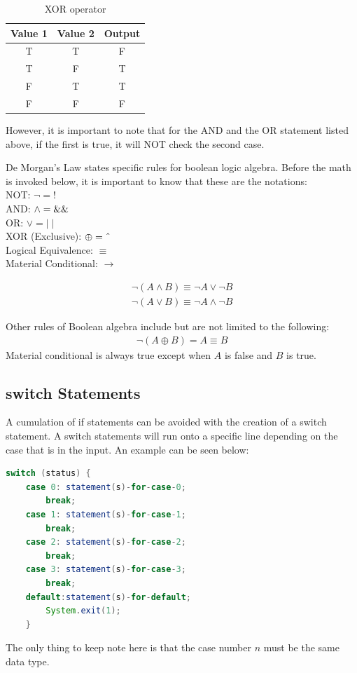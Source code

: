 \documentclass[11pt,a4 paper]{book}
\theoremstyle{plain}
\newtheorem{thm}{Theorem}[section]
\theoremstyle{definition}
\theoremstyle{remark}
\begin{document}
\begin{flushleft}
\begin{table}[H]
	\caption{XOR operator}
	\label{tab:XOR}
	\begin{tabular}{ccc}
		\hline
	Value 1 & Value 2 & Output \\
	\hline
	T & T & F \\
	T & F & T \\
	F & T & T \\
	F & F & F \\
	\hline
	\end{tabular}
\end{table}
However, it is important to note that for the AND and the OR statement listed above, if the first is true, it will NOT check the second case.
\begin{tcolorbox}[colback=black!3!white,colframe=black!60!white,title=\begin{thm}De Morgan's Law \label{De Morgan's Law}\end{thm}]
	De Morgan's Law states specific rules for boolean logic algebra. Before the math is invoked below, it is important to know that these are the notations: \\	
	NOT: $\neg = !$ \\
	AND: $\land = \string& \string& $ \\
	OR: $\lor =  \mid\mid $ \\
	XOR (Exclusive): $\oplus = \string^$ \\
	Logical Equivalence: $\equiv$ \\
	Material Conditional:  $\to $

		\begin{align}
			\neg\left( A \land B \right) \equiv \neg A \lor \neg B\\
			\neg\left( A \lor B \right) \equiv \neg A \land \neg B 
		\end{align}

\end{tcolorbox} 
Other rules of Boolean algebra include but are not limited to the following:
\begin{align*}
	\neg\left( A \oplus B\right) = A \equiv B
\end{align*}
Material conditional is always true except when $A$ is false and $B$ is true.

\subsection{switch Statements}
A cumulation of if statements can be avoided with the creation of a switch statement. A switch statements will run onto a specific line depending on the case that is in the input. An example can be seen below:
\begin{lstlisting}[language = Java]
switch (status) {
	case 0: statement(s)-for-case-0;
		break;
	case 1: statement(s)-for-case-1;
		break;
	case 2: statement(s)-for-case-2;
		break;
	case 3: statement(s)-for-case-3;
		break;
	default:statement(s)-for-default;
		System.exit(1);
	}
\end{lstlisting}
The only thing to keep note here is that the case number $n$ must be the same data type.


\end{flushleft}
\end{document}
